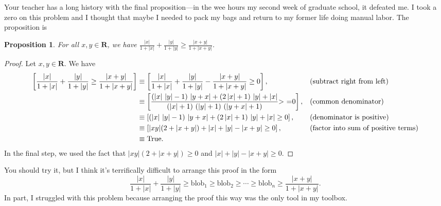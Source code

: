 \documentclass[12pt,fleqn]{article}
\newcommand{\reals}{\mathbf{R}}
\newcommand{\true}{\mathrm{True}}
\newenvironment{myproof}
  {\begin{shaded}\begin{proof}}
  {\end{proof}\end{shaded}}
\newtheorem{prop}{Proposition}
\begin{document}
Your teacher has a long history with the final proposition---in the wee hours my second week of graduate school, it defeated me. I took a
zero on this problem and I thought that maybe I needed to pack my 
bags and return to my former life doing manual labor. The proposition is 

\begin{prop} For all $x,y \in \reals$, we have $\displaystyle \frac{|x|}{1 + |x|} +     \frac{|y|}{1 + |y|}  \geq   \frac{|x+y|}{1 + |x+y|}    $.  \end{prop}            

\begin{myproof} Let  $x,y \in \reals$.  We have
\begin{align*}
  \left[\frac{|x|}{1 + |x|} +     \frac{|y|}{1 + |y|}  \geq   \frac{|x+y|}{1 + |x+y|}   \right] &\equiv 
       \left[\frac{|x|}{1 + |x|} +     \frac{|y|}{1 + |y|}  -  \frac{|x+y|}{1 + |x+y|}   \geq 0  \right],  && \mbox{(subtract right from left)} \\
        &\equiv \left[  \frac{\left( \left| x\right| \, \left| y\right| -1\right) \, \left| y+x\right| +\left( 2 \left| x\right| +1\right) \, \left| y\right| +\left| x\right| }{\left( \left| x\right| +1\right) \, \left( \left| y\right| +1\right) \, \left( \left| y+x\right| +1\right) }\mbox{>  =}0 \right], 
        && \mbox{(common denominator)}      \\
        &\equiv \left[ \left( \left| x\right| \, \left| y\right| -1\right) \, \left| y+x\right| +\left( 2 \left| x\right| +1\right) \, \left| y\right| +\left| x\right|  \geq 0 \right], &&\mbox{(denominator is positive)} \\
        &\equiv \left[  |x y| (2 + |x+y|) + |x| + |y| - |x + y|  \geq 0  \right],  && \mbox{(factor into sum of positive terms)} \\
        &\equiv \true. \qedhere
 \end{align*}
 In the final step, we used the fact that $|x y| (2 + |x+y|) \geq 0$
 and $|x| + |y| - |x + y| \geq 0$.
\end{myproof}
\noindent You should try it, but I think it's terrifically difficult to arrange this proof in the form 
\begin{equation*} 
   \frac{|x|}{1 + |x|} +     \frac{|y|}{1 + |y|} \geq \mbox{blob}_1 
\geq \mbox{blob}_2 \geq \cdots  \geq \mbox{blob}_n  \geq  \frac{|x+y|}{1 + |x+y|}.
\end{equation*}
In part, I struggled with this problem because arranging the proof this way was the only tool in my toolbox.
\end{document}
